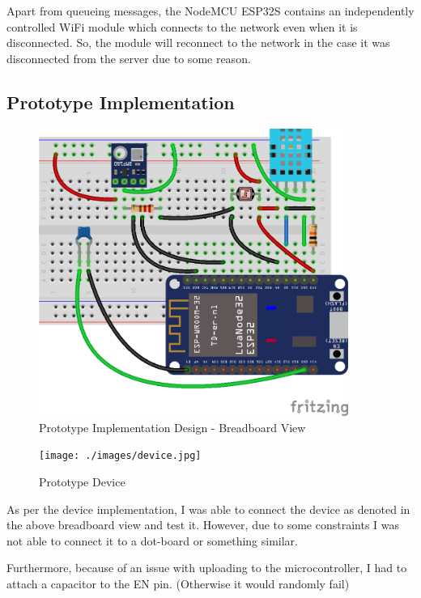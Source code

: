 \documentclass[12pt,a4paper]{article}
\begin{document}
Apart from queueing messages, the NodeMCU ESP32S contains an independently controlled
WiFi module which connects to the network even when it is disconnected. So, the module
will reconnect to the network in the case it was disconnected from the server due to
some reason.

\subsection{Prototype Implementation}

\begin{figure}[H]
    \centering
    \includegraphics[width=0.9\textwidth]{./images/breadboard.png}
    \caption{Prototype Implementation Design - Breadboard View}
\end{figure}

\begin{minipage}{0.45\linewidth}
    \begin{figure}[H]
        \centering
        \texttt{[image: ./images/device.jpg]}
        \caption{Prototype Device}
    \end{figure}
\end{minipage}\hfil
\begin{minipage}{0.4\linewidth}
    As per the device implementation, I was able to connect the device as denoted in the
    above breadboard view and test it. However, due to some constraints  I was not able  to
    connect it to a dot-board or something similar.

    Furthermore, because of an issue with uploading to the microcontroller,
    I had to attach a capacitor to the EN pin. (Otherwise it would randomly fail)
\end{minipage}
\vspace{20pt}
\end{document}
